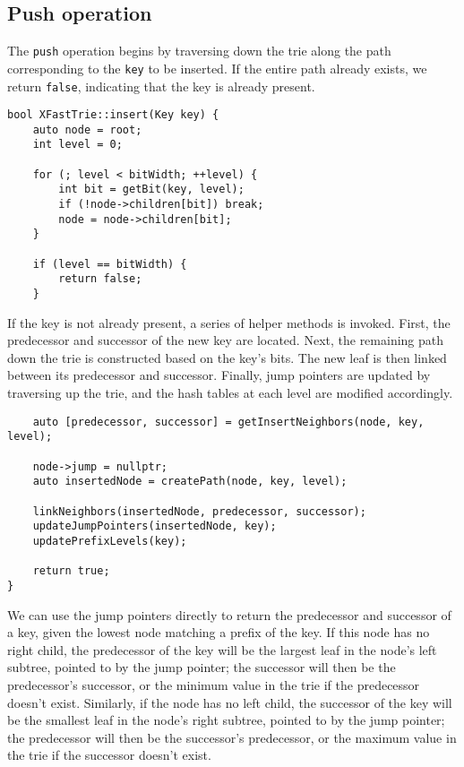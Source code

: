\subsection{Push operation}
The \texttt{push} operation begins by traversing down the trie along the path corresponding to the \texttt{key} to be inserted. If the entire path already exists, we return \texttt{false}, indicating that the key is already present.

\begin{verbatim}
bool XFastTrie::insert(Key key) {
    auto node = root;
    int level = 0;

    for (; level < bitWidth; ++level) {
        int bit = getBit(key, level);
        if (!node->children[bit]) break;
        node = node->children[bit];
    }

    if (level == bitWidth) {
        return false;
    }
\end{verbatim}

If the key is not already present, a series of helper methods is invoked. First, the predecessor and successor of the new key are located. Next, the remaining path down the trie is constructed based on the key's bits. The new leaf is then linked between its predecessor and successor. Finally, jump pointers are updated by traversing up the trie, and the hash tables at each level are modified accordingly.

\begin{verbatim}
    auto [predecessor, successor] = getInsertNeighbors(node, key, level);

    node->jump = nullptr;
    auto insertedNode = createPath(node, key, level);

    linkNeighbors(insertedNode, predecessor, successor);
    updateJumpPointers(insertedNode, key);
    updatePrefixLevels(key);

    return true;
}
\end{verbatim}

We can use the jump pointers directly to return the predecessor and successor of a key, given the lowest node matching a prefix of the key. If this node has no right child, the predecessor of the key will be the largest leaf in the node's left subtree, pointed to by the jump pointer; the successor will then be the predecessor's successor, or the minimum value in the trie if the predecessor doesn't exist. Similarly, if the node has no left child, the successor of the key will be the smallest leaf in the node's right subtree, pointed to by the jump pointer; the predecessor will then be the successor's predecessor, or the maximum value in the trie if the successor doesn't exist.

